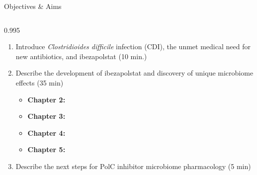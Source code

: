\begin{frame}{Objectives \& Aims}
  \vspace*{-10mm}
  \begin{minipage}[t][\usableheight][t]{\usablewidth}
    \begin{columns}[T]
      \begin{column}{0.995\usablewidth}
        \begin{block}{}
          \vspace*{+5mm}
          \begin{enumerate}
            \item \textcolor{\ObjOneColor}{Introduce \textit{Clostridioides difficile} infection (CDI), the unmet medical need for new antibiotics, and ibezapolstat (10 min.)}
            \item \textcolor{\ObjTwoColor}{Describe the development of ibezapolstat and discovery of unique microbiome effects (35 min)}
              \begin{itemize}\scriptsize
                \item \textcolor{\ChapTwoColor}{\textbf{Chapter 2:} \protect\chaptertwo}   %
                \item \textcolor{\ChapThreeColor}{\textbf{Chapter 3:} \protect\chapterthree}
                \item \textcolor{\ChapFourColor}{\textbf{Chapter 4:} \protect\chapterfour}
                \item \textcolor{\ChapFiveColor}{\textbf{Chapter 5:} \protect\chapterfive}
              \end{itemize}
            \item \textcolor{\ObjThreeColor}{Describe the next steps for PolC inhibitor microbiome pharmacology (5 min)}
          \end{enumerate}
        \end{block}
      \end{column}
    \end{columns}
  \end{minipage}
\end{frame}
